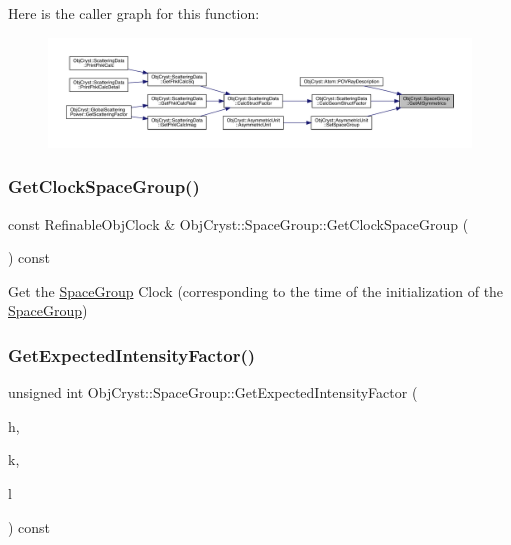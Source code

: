 Here is the caller graph for this function\+:
\nopagebreak
\begin{figure}[H]
\begin{center}
\leavevmode
\includegraphics[width=350pt]{class_obj_cryst_1_1_space_group_acda90f46fd5332c08b2915973ae9c1ad_icgraph}
\end{center}
\end{figure}
\mbox{\label{class_obj_cryst_1_1_space_group_ad654f4826b6ca9fd2ad021286ed703ac}} 
\subsubsection{\texorpdfstring{GetClockSpaceGroup()}{GetClockSpaceGroup()}}
{\footnotesize\ttfamily const Refinable\+Obj\+Clock \& Obj\+Cryst\+::\+Space\+Group\+::\+Get\+Clock\+Space\+Group (\begin{DoxyParamCaption}{ }\end{DoxyParamCaption}) const}

Get the \mbox{\hyperlink{class_obj_cryst_1_1_space_group}{Space\+Group}} Clock (corresponding to the time of the initialization of the \mbox{\hyperlink{class_obj_cryst_1_1_space_group}{Space\+Group}}) \mbox{\label{class_obj_cryst_1_1_space_group_a6f0b08e8a3e713b596bc424407859d7a}} 
\subsubsection{\texorpdfstring{GetExpectedIntensityFactor()}{GetExpectedIntensityFactor()}}
{\footnotesize\ttfamily unsigned int Obj\+Cryst\+::\+Space\+Group\+::\+Get\+Expected\+Intensity\+Factor (\begin{DoxyParamCaption}\item[{const R\+E\+AL}]{h,  }\item[{const R\+E\+AL}]{k,  }\item[{const R\+E\+AL}]{l }\end{DoxyParamCaption}) const}

